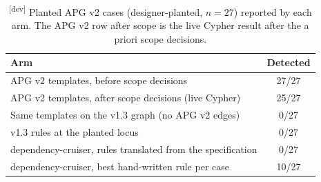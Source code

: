 \documentclass[10pt,a4paper]{article}
\newcommand{\devset}{\textsuperscript{\textsf{\tiny[dev]}}}
\newcommand{\dc}{dependency-cruiser}
\begin{document}
\begin{table}[t]
\centering\small
\caption{\devset{} Planted APG v2 cases (designer-planted, $n = 27$) reported by each arm. The APG v2 row after scope
is the live Cypher result after the a priori scope decisions.}
\label{tab:v13-apg2}
\begin{tabular}{lc}
\toprule
Arm & Detected \\
\midrule
APG v2 templates, before scope decisions & 27/27 \\
APG v2 templates, after scope decisions (live Cypher) & 25/27 \\
Same templates on the v1.3 graph (no APG v2 edges) & 0/27 \\
v1.3 rules at the planted locus & 0/27 \\
\dc{}, rules translated from the specification & 0/27 \\
\dc{}, best hand-written rule per case & 10/27 \\
\bottomrule
\end{tabular}
\end{table}
\end{document}
